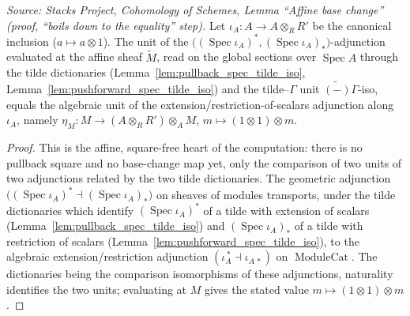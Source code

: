 
\begin{lemma}

  \label{lem:base_change_mate_unit_value}
  \textit{Source: Stacks Project, Cohomology of Schemes, Lemma ``Affine base change''
  (proof, ``boils down to the equality'' step).}
  Let \(\iota_A : A \to A \otimes_R R'\) be the canonical inclusion
  (\(a \mapsto a \otimes 1\)). The unit of the
  \(\bigl((\operatorname{Spec}\iota_A)^*, (\operatorname{Spec}\iota_A)_*\bigr)\)-adjunction
  evaluated at the affine sheaf \(\widetilde M\), read on the global sections over
  \(\operatorname{Spec} A\) through the tilde dictionaries
  (Lemma~\ref{lem:pullback_spec_tilde_iso}, Lemma~\ref{lem:pushforward_spec_tilde_iso}) and
  the tilde--\(\Gamma\) unit \(\widetilde{(-)}\Gamma\)-iso, equals the algebraic unit of the
  extension/restriction-of-scalars adjunction along \(\iota_A\), namely
  \(\eta_M : M \to (A \otimes_R R') \otimes_A M\), \(m \mapsto (1 \otimes 1) \otimes m\).
\end{lemma}
\begin{proof}
  This is the affine, square-free heart of the computation: there is no pullback square and
  no base-change map yet, only the comparison of two units of two adjunctions related by the
  two tilde dictionaries. The geometric adjunction
  \(\bigl((\operatorname{Spec}\iota_A)^* \dashv (\operatorname{Spec}\iota_A)_*\bigr)\) on
  sheaves of modules transports, under the tilde dictionaries which identify
  \((\operatorname{Spec}\iota_A)^*\) of a tilde with extension of scalars
  (Lemma~\ref{lem:pullback_spec_tilde_iso}) and \((\operatorname{Spec}\iota_A)_*\) of a tilde
  with restriction of scalars (Lemma~\ref{lem:pushforward_spec_tilde_iso}), to the algebraic
  extension/restriction adjunction \((\iota_A^{\,*} \dashv \iota_{A\,*})\) on
  \(\operatorname{ModuleCat}\). The dictionaries being the comparison isomorphisms of these
  adjunctions, naturality identifies the two units; evaluating at \(M\) gives the stated
  value \(m \mapsto (1 \otimes 1) \otimes m\).
\end{proof}

